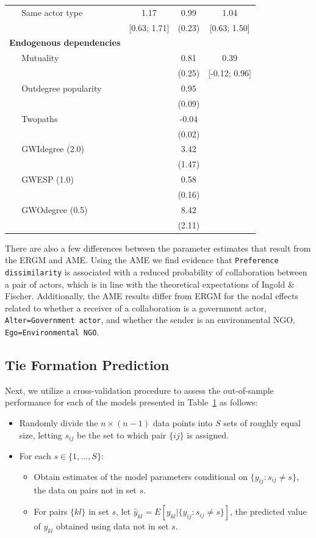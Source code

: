 \documentclass[12pt,pdflatex]{elsarticle}
\begin{document}
\begin{table}[ht]
\begin{tabular}{lccc}
  $\;\;\;\;$ Same actor type & 1.17 & 0.99 & 1.04 \\
   & [0.63; 1.71] & (0.23) & [0.63; 1.50] \\
  \textbf{Endogenous dependencies}  &  &  &  \\
  $\;\;\;\;$ Mutuality &  & 0.81 & 0.39 \\
   &  & (0.25) & [-0.12; 0.96] \\
  $\;\;\;\;$ Outdegree popularity  &  & 0.95 &  \\
   &  & (0.09) &  \\
  $\;\;\;\;$ Twopaths  &  & -0.04 &  \\
  &  & (0.02) &  \\
  $\;\;\;\;$ GWIdegree (2.0)  &  & 3.42 &  \\
   &  & (1.47) &  \\
  $\;\;\;\;$ GWESP (1.0)  &  & 0.58 &  \\
   &  & (0.16) &  \\
  $\;\;\;\;$ GWOdegree (0.5)  &  & 8.42 &  \\
   &  & (2.11) &  \\
   \hline
\hline
\end{tabular}
\label{tab:regTable}
\end{table}
\FloatBarrier

There are also a few differences between the parameter estimates that result from the ERGM and AME. Using the AME we find evidence that \texttt{Preference dissimilarity} is associated with a reduced probability of collaboration between a pair of actors, which is in line with the theoretical expectations of Ingold \& Fischer. Additionally, the AME results differ from ERGM for the nodal effects related to whether a receiver of a collaboration is a government actor, \texttt{Alter=Government actor}, and whether the sender is an environmental NGO, \texttt{Ego=Environmental NGO}.

\subsection*{Tie Formation Prediction}

Next, we utilize a cross-validation procedure to assess the out-of-sample performance for each of the models presented in Table~\ref{tab:regTable} as follows:

\begin{itemize}
	\item Randomly divide the $n \times (n-1)$ data points into $S$ sets of roughly equal size, letting $s_{ij}$ be the set to which pair $\{ij\}$ is assigned.
	\item For each $s \in \{1, \ldots, S\}$:
	\begin{itemize}
		\item Obtain estimates of the model parameters conditional on $\{y_{ij} : s_{ij} \neq s\}$, the data on pairs not in set $s$.
		\item For pairs $\{kl\}$ in set $s$, let $\hat y_{kl} = E[y_{kl} | \{y_{ij} : s_{ij} \neq s\}]$, the predicted value of $y_{kl}$ obtained using data not in set $s$.
	\end{itemize}
\end{itemize}
\end{document}
